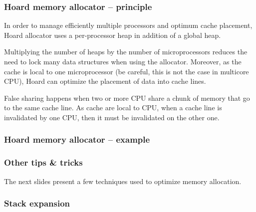 
\begin{frame}
  \frametitle{Hoard memory allocator -- principle}

  In order to manage efficiently multiple processors and optimum cache
  placement, Hoard allocator uses a per-processor heap in addition of
  a global heap.

  \-

  Multiplying the number of heaps by the number of microprocessors
  reduces the need to lock many data structures when using the
  allocator. Moreover, as the cache is local to one microprocessor (be
  careful, this is not the case in multicore CPU), Hoard can optimize
  the placement of data into cache lines.

  \-

  False sharing happens when two or more CPU share a chunk of memory
  that go to the same cache line. As cache are local to CPU, when a
  cache line is invalidated by one CPU, then it must be invalidated on
  the other one.

  \begin{center}
  \end{center}

\end{frame}


\begin{frame}
  \frametitle{Hoard memory allocator -- example}

  \begin{center}
  \end{center}

\end{frame}


\begin{frame}
  \frametitle{Other tips \& tricks}

  The next slides present a few techniques used to optimize memory
  allocation.

\end{frame}


\begin{frame}
  \frametitle{Stack expansion}

  \begin{center}
  \end{center}

\end{frame}

